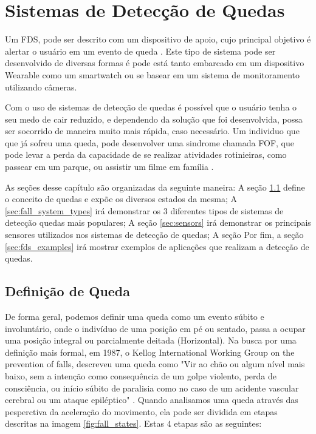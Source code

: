 \chapter{Sistemas de Detecção de Quedas}
\label{cap:sistemasRecomendacao}

Um \ac{FDS}, pode ser descrito com um dispositivo de apoio, cujo principal objetivo é alertar o usuário em um evento de queda \citep{igual2013challenges}. Este tipo de sistema pode ser desenvolvido de diversas formas é pode está tanto embarcado em um dispositivo Wearable como um smartwatch ou se basear em um sistema de monitoramento utilizando câmeras.

Com o uso de sistemas de detecção de quedas é possível que o usuário tenha o seu medo de cair reduzido, e dependendo da solução que foi desenvolvida, possa ser socorrido de maneira muito mais rápida, caso necessário. Um individuo que que já sofreu uma queda, pode desenvolver uma sindrome chamada \ac{FOF}, que pode levar a perda da capacidade de se realizar atividades rotinieiras, como passear em um parque, ou assistir um filme em família \citep{legters2002fear}.

As seções desse capítulo são organizadas da seguinte maneira: A seção \ref{sec:fall_definition} define o conceito de quedas e expõe os diversos estados da mesma; A \ref{sec:fall_system_types} irá demonstrar os 3 diferentes tipos de sistemas de detecção quedas mais populares; A seção \ref{sec:sensors} irá demonstrar os principais sensores utilizados nos sistemas de detecção de quedas; A seção  Por fim, a seção \ref{sec:fds_examples}  irá mostrar exemplos de aplicações que realizam a detecção de quedas. 



\section{Definição de Queda}
\label{sec:fall_definition}
De forma geral, podemos definir uma queda como um evento súbito e involuntário, onde o indivíduo de uma posição em pé ou sentado, passa a ocupar uma posição integral ou parcialmente deitada (Horizontal). Na busca por uma definição mais formal, em 1987, o Kellog International Working Group on the prevention of falls, descreveu uma queda como "Vir ao chão ou algum nível mais baixo, sem a intenção como consequência de um golpe violento, perda de consciência, ou início súbito de paralisia como no caso de um acidente vascular cerebral ou um ataque epiléptico"  \citep{igual2013challenges}. Quando analisamos uma queda através das pesperctiva da aceleração do movimento, ela pode ser dividida em etapas descritas na imagem \ref{fig:fall_states}. Estas 4 etapas são as seguintes:



